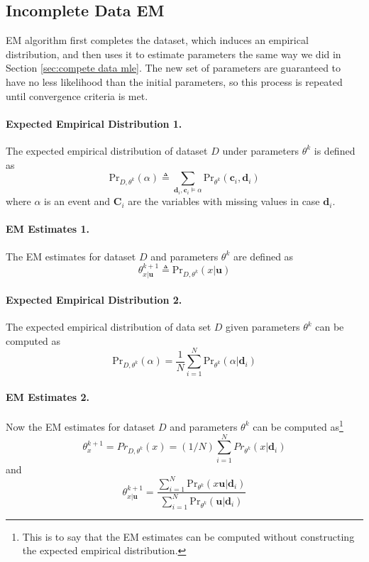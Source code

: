 \documentclass[11pt]{article}
\newcommand{\bc}{\mathbf{c}}
\newcommand{\bd}{\mathbf{d}}
\newcommand{\bu}{\mathbf{u}}
\newcommand{\pr}{\mathrm{Pr}}
\begin{document}
\subsection{Incomplete Data EM}
EM algorithm first completes the dataset, which induces an empirical distribution, and then uses it to estimate parameters the same way we did in Section \ref{sec:compete data mle}. The new set of parameters are guaranteed to have no less likelihood than the initial parameters, so this process is repeated until convergence criteria is met. 

\paragraph{Expected Empirical Distribution 1.} The expected empirical distribution of dataset $D$ under parameters $\theta^k$ is defined as 
\begin{equation}
	\pr_{D, \theta^k} (\alpha) \triangleq \sum_{\bd_i, \bc_i \vDash \alpha} \pr_{\theta^k}(\bc_i, \bd_i)
\end{equation}
where $\alpha$ is an event and $\mathbf C_i$ are the variables with missing values in case $\bd_i$. 

\paragraph{EM Estimates 1.}  The EM estimates for dataset $D$ and parameters $\theta^k$ are defined as 
\begin{equation}
	\theta_{x|\mathbf u}^{k + 1} \triangleq \pr_{D, \theta^k} (x|\bu)
\end{equation}

\paragraph{Expected Empirical Distribution 2.} The expected empirical distribution of data set $D$ given parameters $\theta^k$ can be computed as 
\begin{equation}
	\pr_{D, \theta^k} (\alpha) = \frac{1}{N} \sum_{i = 1}^N \pr_{\theta^k}  (\alpha | \bd_i)
\end{equation}

\paragraph{EM Estimates 2.} Now the EM estimates for dataset $D$ and parameters $\theta^k$ can be computed as\footnote{This is to say that the EM estimates can be computed without constructing the expected empirical distribution.}
\begin{equation}
	\theta_{x} ^{k + 1} = Pr_{D, \theta^k} (x) = (1/N) \sum_{i = 1}^N Pr_{\theta^k} (x | \bd_i)
\end{equation}
and
\begin{equation}
	\theta_{x|\bu}^{k + 1} = \frac{\sum_{i= 1}^N \pr_{\theta^k} (x\bu | \bd_i)}{\sum_{i = 1}^N \pr_{\theta^k} (\bu | \bd_i)}
\end{equation}
\end{document}
